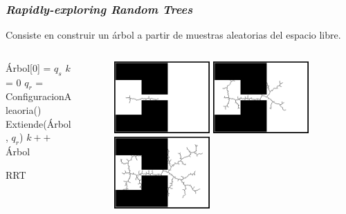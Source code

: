\documentclass[10pt,spanish,aspectratio=1610]{beamer}
\begin{document}
\begin{frame}\frametitle{\textit{Rapidly-exploring Random Trees}}
  Consiste en construir un árbol a partir de muestras aleatorias del espacio libre.
  \begin{columns}
    \begin{column}{0.4\textwidth}
      \begin{algorithm}[H]\small
        Árbol[0] = $q_{s}$\;
        $k$ = 0\;
              {
                $q_{r}$ = ConfiguracionAleaoria()\;
                Extiende(Árbol, $q_{r}$)\;
                $k++$\;
              }
              \Return Árbol\;
              \caption{RRT}
      \end{algorithm}
    \end{column}
    \begin{column}{0.6\textwidth}
      \begin{figure}
        \centering
        \includegraphics[width=0.45\textwidth]{Figures/RRTO010.png}
        \includegraphics[width=0.45\textwidth]{Figures/RRTO0100.png}
        \includegraphics[width=0.45\textwidth]{Figures/RRTO0300.png}
      \end{figure}
    \end{column}
  \end{columns}
\end{frame}
\end{document}
